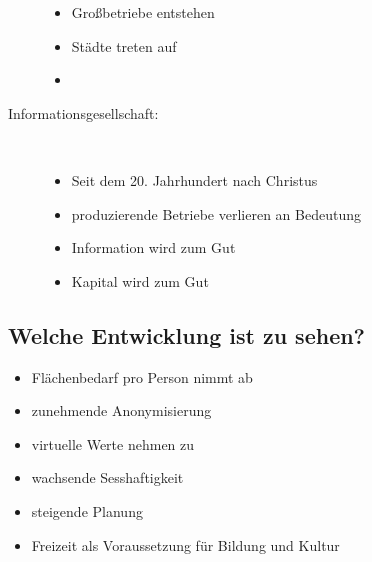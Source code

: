 \begin{description}
\begin{itemize}
		\item Großbetriebe entstehen
		\item Städte treten auf
		\item {} 
	\end{itemize}
	\item[Informationsgesellschaft:]~
	\begin{itemize}
		\item Seit dem 20. Jahrhundert nach Christus
		\item produzierende Betriebe verlieren an Bedeutung
		\item Information wird zum Gut
		\item Kapital wird zum Gut 
	\end{itemize}
\end{description}

\subsection{Welche Entwicklung ist zu sehen?}
\begin{itemize}
	\item Flächenbedarf pro Person nimmt ab
	\item zunehmende Anonymisierung
	\item virtuelle Werte nehmen zu
	\item wachsende Sesshaftigkeit
	\item steigende Planung
	\item Freizeit als Voraussetzung für Bildung und Kultur
\end{itemize}


